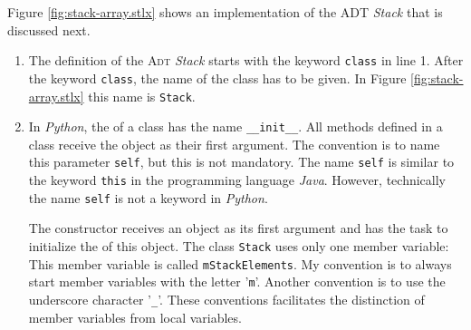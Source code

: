 Figure \ref{fig:stack-array.stlx} shows an implementation of the ADT \textsl{Stack} that is 
discussed next.
\begin{enumerate}
\item The definition of the \textsc{Adt} \textsl{Stack} starts with the keyword \texttt{class}
      in line 1.
      After the keyword \texttt{class}, the name of the class has to be given.  In Figure
      \ref{fig:stack-array.stlx} this name is \texttt{Stack}.
\item In \textsl{Python}, the  of a class has the name \texttt{\_\_init\_\_}.
      All methods defined in a class receive the object as their first argument.
      The convention is to name this parameter \texttt{self}, but this is not mandatory.
      The name \texttt{self} is similar to the keyword \texttt{this} in the programming language
      \textsl{Java}.  However, technically the name \texttt{self} is not a keyword in \textsl{Python}.
      
      The constructor receives an  object as its first argument and has the task
      to initialize the  of this object.  The class \texttt{Stack} uses only one member variable:
      This member variable is called \texttt{mStackElements}.  My convention is to always start member
      variables with the letter '\texttt{m}'.  Another convention is to use the underscore character
      '\texttt{\_}'.  These conventions facilitates the distinction of member variables from local variables.


\end{enumerate}

